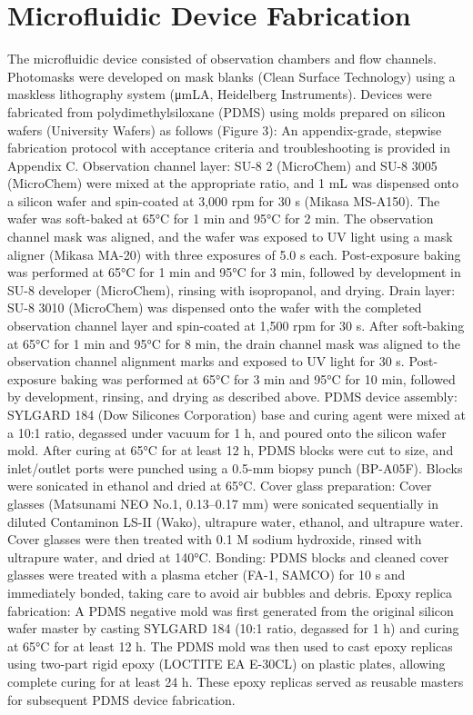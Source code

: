 \section{Microfluidic Device Fabrication}
The microfluidic device consisted of observation chambers and flow channels. Photomasks were developed on mask blanks (Clean Surface Technology) using a maskless lithography system (μmLA, Heidelberg Instruments). Devices were fabricated from polydimethylsiloxane (PDMS) using molds prepared on silicon wafers (University Wafers) as follows (Figure 3):
An appendix-grade, stepwise fabrication protocol with acceptance criteria and troubleshooting is provided in Appendix C.
Observation channel layer: SU-8 2 (MicroChem) and SU-8 3005 (MicroChem) were mixed at the appropriate ratio, and 1 mL was dispensed onto a silicon wafer and spin-coated at 3,000 rpm for 30 s (Mikasa MS-A150). The wafer was soft-baked at 65°C for 1 min and 95°C for 2 min. The observation channel mask was aligned, and the wafer was exposed to UV light using a mask aligner (Mikasa MA-20) with three exposures of 5.0 s each. Post-exposure baking was performed at 65°C for 1 min and 95°C for 3 min, followed by development in SU-8 developer (MicroChem), rinsing with isopropanol, and drying.
Drain layer: SU-8 3010 (MicroChem) was dispensed onto the wafer with the completed observation channel layer and spin-coated at 1,500 rpm for 30 s. After soft-baking at 65°C for 1 min and 95°C for 8 min, the drain channel mask was aligned to the observation channel alignment marks and exposed to UV light for 30 s. Post-exposure baking was performed at 65°C for 3 min and 95°C for 10 min, followed by development, rinsing, and drying as described above.
PDMS device assembly: SYLGARD 184 (Dow Silicones Corporation) base and curing agent were mixed at a 10:1 ratio, degassed under vacuum for 1 h, and poured onto the silicon wafer mold. After curing at 65°C for at least 12 h, PDMS blocks were cut to size, and inlet/outlet ports were punched using a 0.5-mm biopsy punch (BP-A05F). Blocks were sonicated in ethanol and dried at 65°C.
Cover glass preparation: Cover glasses (Matsunami NEO No.1, 0.13–0.17 mm) were sonicated sequentially in diluted Contaminon LS-II (Wako), ultrapure water, ethanol, and ultrapure water. Cover glasses were then treated with 0.1 M sodium hydroxide, rinsed with ultrapure water, and dried at 140°C.
Bonding: PDMS blocks and cleaned cover glasses were treated with a plasma etcher (FA-1, SAMCO) for 10 s and immediately bonded, taking care to avoid air bubbles and debris.
Epoxy replica fabrication: A PDMS negative mold was first generated from the original silicon wafer master by casting SYLGARD 184 (10:1 ratio, degassed for 1 h) and curing at 65°C for at least 12 h. The PDMS mold was then used to cast epoxy replicas using two-part rigid epoxy (LOCTITE EA E-30CL) on plastic plates, allowing complete curing for at least 24 h. These epoxy replicas served as reusable masters for subsequent PDMS device fabrication.

